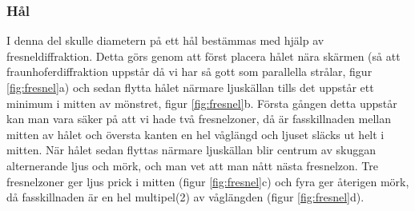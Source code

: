 \documentclass[a4paper]{article}
\begin{document}
\subsubsection{Hål}
I denna del skulle diametern på ett hål bestämmas med hjälp av fresneldiffraktion. Detta görs genom att först placera hålet
nära skärmen (så att fraunhoferdiffraktion uppstår då vi har så gott som parallella strålar, figur \ref{fig:fresnel}a) och sedan flytta hålet närmare ljuskällan
tills det uppstår ett minimum i mitten av mönstret, figur \ref{fig:fresnel}b. Första gången detta uppstår kan man vara säker på att vi hade två fresnelzoner, då
är fasskillnaden mellan mitten av hålet och översta kanten en hel våglängd och ljuset släcks ut helt i mitten. När hålet sedan flyttas närmare ljuskällan blir centrum
av skuggan alternerande ljus och mörk, och man vet att man nått nästa fresnelzon. Tre fresnelzoner ger ljus prick i mitten (figur \ref{fig:fresnel}c) och fyra ger återigen
mörk, då fasskillnaden är en hel multipel(2) av våglängden (figur \ref{fig:fresnel}d).
\end{document}
